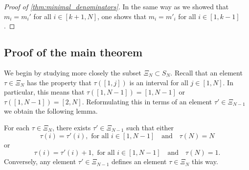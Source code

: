 \begin{proof}[Proof of \cref{thm:minimal_denominators}]
	In the same way as we showed that $m_i = m_i'$ for all $i \in [k+1, N]$, one shows that
	$m_i = m'_i$ for all $i \in [1, k-1]$.
\end{proof}

\subsection{Proof of the main theorem}

We begin by studying more closely the subset $\Xi_N \subset S_N$. Recall that an
element $\tau \in \Xi_N$ has the property that $\tau([1, j])$ is an interval for all $j
	\in [1, N]$. In particular, this means that $\tau([1, N-1]) = [1, N-1]$ or $\tau([1,
		N-1]) = [2, N]$. Reformulating this in terms of an element $\tau' \in \Xi_{N-1}$ we
obtain the following lemma.
\begin{lemma}
	For each $\tau \in \Xi_N$, there exists $\tau' \in \Xi_{N-1}$ such that either
	\begin{equation*}
		\tau(i) = \tau'(i), \text{ for all } i \in [1, N-1] \quad \text{and} \quad \tau(N) = N
	\end{equation*}
	or
	\begin{equation*}
		\tau(i) = \tau'(i) + 1, \text{ for all } i \in [1, N-1] \quad \text{and} \quad \tau(N) = 1.
	\end{equation*}
	Conversely, any element $\tau' \in \Xi_{N-1}$ defines an element $\tau \in \Xi_N$ this
	way.
\end{lemma}

